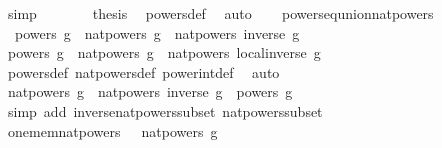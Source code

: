 \begin{isabellebody}
\ simp\isanewline
\ \ \ \ \isamarkupfalse%
\ \isamarkupfalse%
\ {\isacharquery}{\kern0pt}thesis\ \isamarkupfalse%
\ powers{\isacharunderscore}{\kern0pt}def\ \isamarkupfalse%
\ auto\isanewline
\ \ \isamarkupfalse%
\isanewline
{}\isamarkupfalse%
%
\endisatagproof
{\isafoldproof}%
%
\isadelimproof
\isanewline
%
\endisadelimproof
\isanewline
{}\isamarkupfalse%
\ powers{\isacharunderscore}{\kern0pt}eq{\isacharunderscore}{\kern0pt}union{\isacharunderscore}{\kern0pt}nat{\isacharunderscore}{\kern0pt}powers{\isacharcolon}{\kern0pt}\isanewline
\ \ {\isachardoublequoteopen}powers\ g\ {\isacharequal}{\kern0pt}\ nat{\isacharunderscore}{\kern0pt}powers\ g\ {\isasymunion}\ nat{\isacharunderscore}{\kern0pt}powers\ {\isacharparenleft}{\kern0pt}inverse\ g{\isacharparenright}{\kern0pt}{\isachardoublequoteclose}\isanewline
%
\isadelimproof
%
\endisadelimproof
%
\isatagproof
{}\isamarkupfalse%
\isanewline
\ \ \isamarkupfalse%
\ {\isachardoublequoteopen}powers\ g\ {\isasymsubseteq}\ nat{\isacharunderscore}{\kern0pt}powers\ g\ {\isasymunion}\ nat{\isacharunderscore}{\kern0pt}powers\ {\isacharparenleft}{\kern0pt}local{\isachardot}{\kern0pt}inverse\ g{\isacharparenright}{\kern0pt}{\isachardoublequoteclose}\isanewline
\ \ \ \ \isamarkupfalse%
\ powers{\isacharunderscore}{\kern0pt}def\ nat{\isacharunderscore}{\kern0pt}powers{\isacharunderscore}{\kern0pt}def\ power{\isacharunderscore}{\kern0pt}int{\isacharunderscore}{\kern0pt}def\ \isamarkupfalse%
\ auto\isanewline
{}\isamarkupfalse%
\ \isanewline
\ \ \isamarkupfalse%
\ {\isachardoublequoteopen}nat{\isacharunderscore}{\kern0pt}powers\ g\ {\isasymunion}\ nat{\isacharunderscore}{\kern0pt}powers\ {\isacharparenleft}{\kern0pt}inverse\ g{\isacharparenright}{\kern0pt}\ {\isasymsubseteq}\ powers\ g{\isachardoublequoteclose}\isanewline
\ \ \ \ \isamarkupfalse%
\ {\isacharparenleft}{\kern0pt}simp\ add{\isacharcolon}{\kern0pt}\ inverse{\isacharunderscore}{\kern0pt}nat{\isacharunderscore}{\kern0pt}powers{\isacharunderscore}{\kern0pt}subset\ nat{\isacharunderscore}{\kern0pt}powers{\isacharunderscore}{\kern0pt}subset{\isacharparenright}{\kern0pt}\isanewline
{}\isamarkupfalse%
%
\endisatagproof
{\isafoldproof}%
%
\isadelimproof
\isanewline
%
\endisadelimproof
\isanewline
{}\isamarkupfalse%
\ one{\isacharunderscore}{\kern0pt}mem{\isacharunderscore}{\kern0pt}nat{\isacharunderscore}{\kern0pt}powers{\isacharcolon}{\kern0pt}\ {\isachardoublequoteopen}{\isasymone}\ {\isasymin}\ nat{\isacharunderscore}{\kern0pt}powers\ g{\isachardoublequoteclose}\isanewline

\end{isabellebody}
